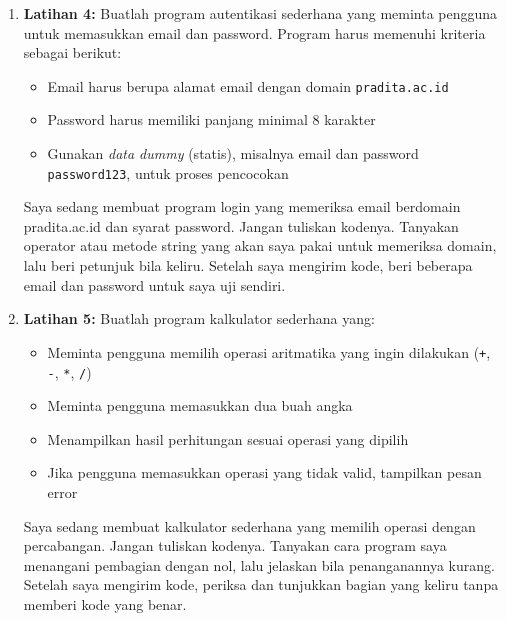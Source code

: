 \begin{enumerate}
  \begin{promptterarah}
  Saya sedang mengubah program BMI agar tinggi badan dimasukkan dalam sentimeter. Jangan tuliskan kodenya. Tanyakan cara saya mengubah sentimeter ke meter, lalu beri satu petunjuk bila jawaban saya keliru. Setelah saya mengirim kode, periksa dan tunjukkan bagian yang keliru tanpa memberi kode yang benar.
  \end{promptterarah}
\item \textbf{Latihan 4:} Buatlah program autentikasi sederhana yang meminta pengguna untuk memasukkan email dan password. Program harus memenuhi kriteria sebagai berikut:
\begin{itemize}
    \item Email harus berupa alamat email dengan domain \texttt{pradita.ac.id}
    \item Password harus memiliki panjang minimal 8 karakter
    \item Gunakan \textit{data dummy} (statis), misalnya email  dan password \texttt{password123}, untuk proses pencocokan
\end{itemize}

  \begin{promptterarah}
  Saya sedang membuat program login yang memeriksa email berdomain pradita.ac.id dan syarat password. Jangan tuliskan kodenya. Tanyakan operator atau metode string yang akan saya pakai untuk memeriksa domain, lalu beri petunjuk bila keliru. Setelah saya mengirim kode, beri beberapa email dan password untuk saya uji sendiri.
  \end{promptterarah}
\item \textbf{Latihan 5:} Buatlah program kalkulator sederhana yang:
\begin{itemize}
    \item Meminta pengguna memilih operasi aritmatika yang ingin dilakukan (\texttt{+}, \texttt{-}, \texttt{*}, \texttt{/})
    \item Meminta pengguna memasukkan dua buah angka
    \item Menampilkan hasil perhitungan sesuai operasi yang dipilih
    \item Jika pengguna memasukkan operasi yang tidak valid, tampilkan pesan error
\end{itemize}

  \begin{promptterarah}
  Saya sedang membuat kalkulator sederhana yang memilih operasi dengan percabangan. Jangan tuliskan kodenya. Tanyakan cara program saya menangani pembagian dengan nol, lalu jelaskan bila penanganannya kurang. Setelah saya mengirim kode, periksa dan tunjukkan bagian yang keliru tanpa memberi kode yang benar.
  \end{promptterarah}
\end{enumerate}

